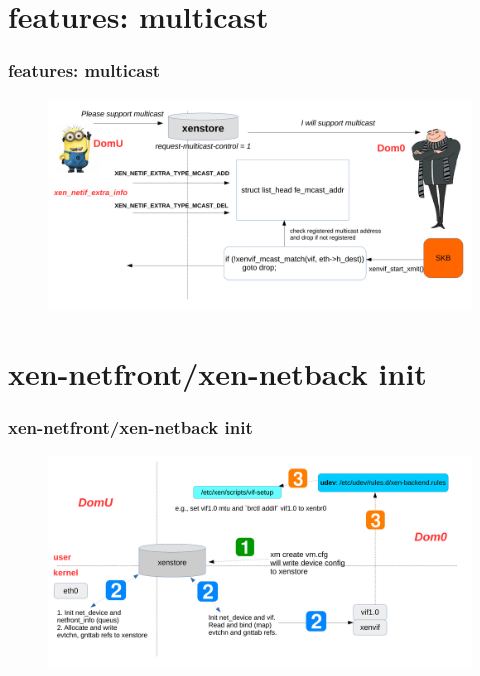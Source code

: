 \documentclass[aspectratio=169]{beamer}
\begin{document}
\section{features: multicast}
\begin{frame}
\frametitle{features: multicast}
\begin{figure}
\includegraphics[width=1.0\linewidth]{figures/multicast.pdf}
\end{figure}
\end{frame}


\section{xen-netfront/xen-netback init}
\begin{frame}
\frametitle{xen-netfront/xen-netback init}
\begin{figure}
\includegraphics[width=1.0\linewidth]{figures/init.pdf}
\end{figure}
\end{frame}

\end{document}
